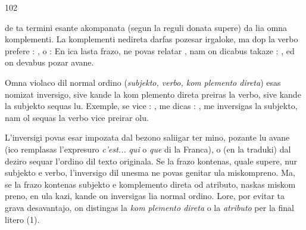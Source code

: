\begin{VUpage}[106]{102}

\VUcontinue
de ta termini esante akompanata (segun la reguli donata\nl
supere) da lia omna komplementi. La komplementi nedireta\nl
darfas pozesar irgaloke, ma dop la verbo prefere : \nl
{}, o : \nl
{} En ica lasta frazo,  ne povas\nl
relatar , nam on dicabus takaze : \cc
{}, ed on devabus pozar  avane.

Omna violaco dil normal ordino (\textit{subjekto, verbo, kom}\cc
\textit{plemento direta}) esas nomizat inversigo, sive kande la kom\cc
plemento direta preiras la verbo, sive kande la subjekto\nl
sequas lu. Exemple, se vice : , me dicas :\nl
{}, me inversigas la subjekto, nam ol\nl
sequas la verbo vice preirar olu.

L'inversigi povas esar impozata dal bezono saliigar ter\cc
mino, pozante lu avane (ico remplasas l'expresuro \textit{c'est...}\nl
\textit{qui} o \textit{que} di la Franca), o (en la traduki) dal deziro sequar\nl
l'ordino dil texto originala. Se la frazo kontenas, quale\nl
supere, nur subjekto e verbo, l'inversigo dil unesma ne\nl
povas genitar ula miskompreno. Ma, se la frazo kontenas\nl
subjekto e komplemento direta od atributo, naskas miskom\cc
preno, en ula kazi, kande on inversigas lia normal ordino.\nl
Lore, por evitar ta grava desavantajo, on distingas la \textit{kom}\cc
\textit{plemento direta} o la \textit{atributo} per la final litero  (1).


\end{VUpage}

